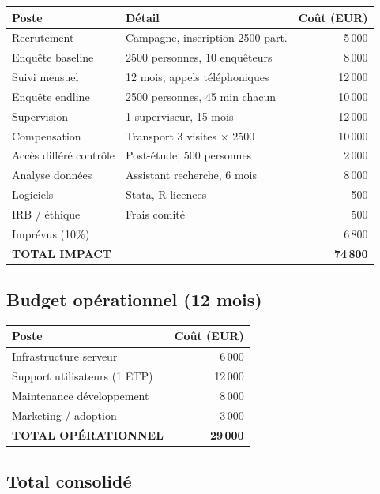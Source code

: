 \documentclass[12pt]{article}
\begin{document}
\begin{table}[h]
\centering
\begin{tabular}{lp{6cm}r}
\toprule
\textbf{Poste} & \textbf{Détail} & \textbf{Coût (EUR)} \\
\midrule
Recrutement & Campagne, inscription 2500 part. & 5\,000 \\
Enquête baseline & 2500 personnes, 10 enquêteurs & 8\,000 \\
Suivi mensuel & 12 mois, appels téléphoniques & 12\,000 \\
Enquête endline & 2500 personnes, 45 min chacun & 10\,000 \\
Supervision & 1 superviseur, 15 mois & 12\,000 \\
Compensation & Transport 3 visites × 2500 & 10\,000 \\
Accès différé contrôle & Post-étude, 500 personnes & 2\,000 \\
Analyse données & Assistant recherche, 6 mois & 8\,000 \\
Logiciels & Stata, R licences & 500 \\
IRB / éthique & Frais comité & 500 \\
Imprévus (10\%) & & 6\,800 \\
\midrule
\textbf{TOTAL IMPACT} & & \textbf{74\,800} \\
\bottomrule
\end{tabular}
\end{table}

\subsection{Budget opérationnel (12 mois)}

\begin{table}[h]
\centering
\begin{tabular}{lr}
\toprule
\textbf{Poste} & \textbf{Coût (EUR)} \\
\midrule
Infrastructure serveur & 6\,000 \\
Support utilisateurs (1 ETP) & 12\,000 \\
Maintenance développement & 8\,000 \\
Marketing / adoption & 3\,000 \\
\midrule
\textbf{TOTAL OPÉRATIONNEL} & \textbf{29\,000} \\
\bottomrule
\end{tabular}
\end{table}

\subsection{Total consolidé}
\end{document}
